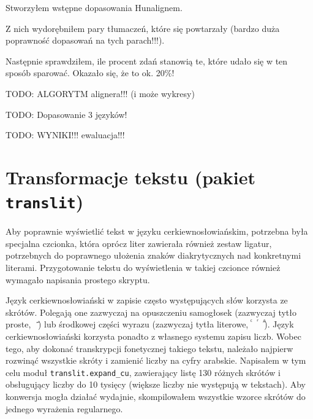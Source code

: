 \documentclass{pracamgr}
\begin{document}




Stworzyłem wstępne dopasowania Hunalignem.

Z nich wydorębniłem pary tłumaczeń, które się powtarzały (bardzo duża
poprawność dopasowań na tych parach!!!).

Następnie sprawdziłem, ile procent zdań stanowią te, które udało się w
ten sposób sparować. Okazało się, że to ok. 20\%!

TODO: ALGORYTM alignera!!! (i może wykresy)

TODO: Dopasowanie 3 języków!

TODO: WYNIKI!!! ewaluacja!!!

\section{Transformacje tekstu (pakiet {\tt translit})}

Aby poprawnie wyświetlić tekst w języku cerkiewno\-{}słowiańskim,
potrzebna była specjalna czcionka, która oprócz liter zawierała
również zestaw ligatur, potrzebnych do poprawnego ułożenia znaków
diakrytycznych nad konkretnymi literami. Przygotowanie tekstu do
wyświetlenia w takiej czcionce również wymagało napisania prostego
skryptu.

Język cerkiewno\-{}słowiański w zapisie często występujących słów korzysta
ze skrótów. Polegają one zazwyczaj na opuszczeniu samogłosek
(zazwyczaj tytło proste, {\cyr\ ҃}) lub środkowej części wyrazu
(zazwyczaj tytła literowe, {\cyr ⷭ\ \ ⷢ\ \ ⷣ}). Język
cerkiewno\-{}słowiański korzysta ponadto z własnego systemu zapisu
liczb. Wobec tego, aby dokonać transkrypcji fonetycznej takiego
tekstu, należało najpierw rozwinąć wszystkie skróty i zamienić liczby
na cyfry arabskie. Napisałem w tym celu moduł {\tt translit.expand\_cu},
zawierający listę 130 różnych skrótów i obsługujący liczby do 10
tysięcy (większe liczby nie występują w tekstach). Aby konwersja mogła
działać wydajnie, skompilowałem wszystkie wzorce skrótów do jednego
wyrażenia regularnego.
\end{document}
